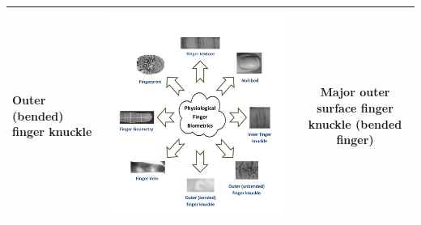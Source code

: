 \documentclass[review]{elsarticle}
\begin{document}
\begin{table}[h]
{\begin{tabular}{|C{3.7cm}|C{3.7cm}|c|}
		 	\textbf{Outer (bended) finger knuckle}& \begin{minipage}{0.75\hsize}\includegraphics[page=1,scale=.5,trim=11.5cm 3.4cm 10.5cm 24cm,clip]{Finger_biometrics.pdf}\end{minipage} & Major outer surface finger knuckle (bended finger) \\ \hline

\end{tabular}}
\end{table}
\end{document}
